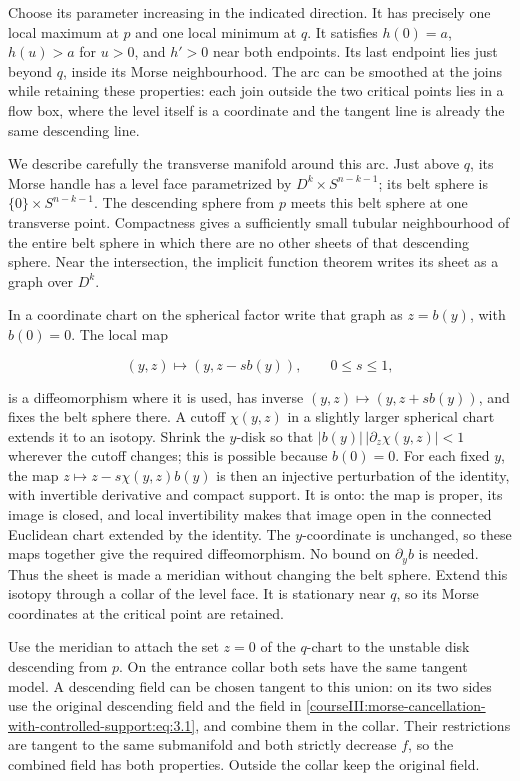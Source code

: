 Choose its parameter increasing in the indicated direction. It has precisely one local maximum at \(p\) and one local minimum at \(q\). It satisfies \(h(0)=a\), \(h(u)>a\) for \(u>0\), and \(h'>0\) near both endpoints. Its last endpoint lies just beyond \(q\), inside its Morse neighbourhood. The arc can be smoothed at the joins while retaining these properties: each join outside the two critical points lies in a flow box, where the level itself is a coordinate and the tangent line is already the same descending line.

We describe carefully the transverse manifold around this arc. Just above \(q\), its Morse handle has a level face parametrized by \(D^k\times S^{n-k-1}\); its belt sphere is \(\{0\}\times S^{n-k-1}\). The descending sphere from \(p\) meets this belt sphere at one transverse point. Compactness gives a sufficiently small tubular neighbourhood of the entire belt sphere in which there are no other sheets of that descending sphere. Near the intersection, the implicit function theorem writes its sheet as a graph over \(D^k\).

In a coordinate chart on the spherical factor write that graph as \(z=b(y)\), with \(b(0)=0\). The local map

\begin{equation}
(y,z)\longmapsto (y,z-sb(y)),\qquad 0\leq s\leq1,
\label{courseIII:morse-cancellation-with-controlled-support:eq:3.3}
\end{equation}

is a diffeomorphism where it is used, has inverse \((y,z)\mapsto(y,z+sb(y))\), and fixes the belt sphere there. A cutoff \(\chi(y,z)\) in a slightly larger spherical chart extends it to an isotopy. Shrink the \(y\)-disk so that \(|b(y)|\,|\partial_z\chi(y,z)|<1\) wherever the cutoff changes; this is possible because \(b(0)=0\). For each fixed \(y\), the map \(z\mapsto z-s\chi(y,z)b(y)\) is then an injective perturbation of the identity, with invertible derivative and compact support. It is onto: the map is proper, its image is closed, and local invertibility makes that image open in the connected Euclidean chart extended by the identity. The \(y\)-coordinate is unchanged, so these maps together give the required diffeomorphism. No bound on \(\partial_yb\) is needed. Thus the sheet is made a meridian without changing the belt sphere. Extend this isotopy through a collar of the level face. It is stationary near \(q\), so its Morse coordinates at the critical point are retained.

Use the meridian to attach the set \(z=0\) of the \(q\)-chart to the unstable disk descending from \(p\). On the entrance collar both sets have the same tangent model. A descending field can be chosen tangent to this union: on its two sides use the original descending field and the field in \eqref{courseIII:morse-cancellation-with-controlled-support:eq:3.1}, and combine them in the collar. Their restrictions are tangent to the same submanifold and both strictly decrease \(f\), so the combined field has both properties. Outside the collar keep the original field.

